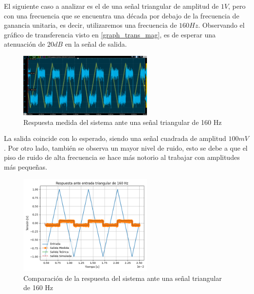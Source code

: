 El siguiente caso a analizar es el de una señal triangular de amplitud de $1V$, pero con una frecuencia
que se encuentra una década por debajo de la frecuencia de ganancia unitaria, es decir, utilizaremos
una frecuencia de $160Hz$. Observando el gráfico de transferencia visto en \ref{graph_trans_mag}, es
de esperar una atenuación de $20dB$ en la señal de salida.

\begin{figure}[H]
    \centering
    \includegraphics[width=0.6\textwidth]{../Ejercicio3-CircuitoIntegradoresyDerivadores/Imagenes/Derivador/trian_160.png}
    \caption{Respuesta medida del sistema ante una señal triangular de 160 Hz}
\end{figure}
La salida coincide con lo esperado, siendo una señal cuadrada de amplitud $100mV$. Por otro lado,
también se observa un mayor nivel de ruido, esto se debe a que el piso de ruido de alta frecuencia 
se hace más notorio al trabajar con amplitudes más pequeñas.
\begin{figure}[H]
    \centering
    \includegraphics[width=0.6\textwidth]{../Ejercicio3-CircuitoIntegradoresyDerivadores/Imagenes/Derivador/rta_triangular_160.png}
    \caption{Comparación de la respuesta del sistema ante una señal triangular de 160 Hz}

\end{figure}


